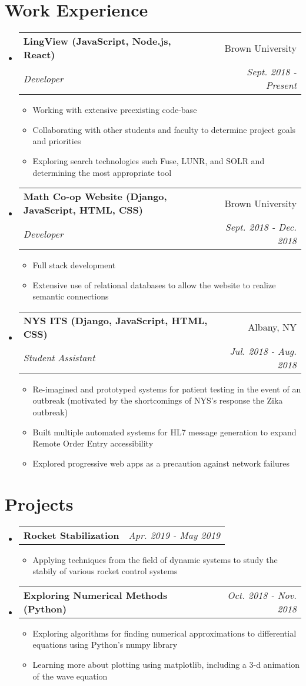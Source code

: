 \documentclass[letterpaper,11pt]{article}
\makeatletter
\newcommand{\resumeItem}[2]{
  \item\small{
    \textbf{#1}{#2 \vspace{-2pt}}
  }
}
\newcommand{\resumeSubheading}[4]{
  \vspace{-1pt}\item
    \begin{tabular*}{0.97\textwidth}{l@{\extracolsep{\fill}}r}
      \textbf{#1} & #2 \\
      \textit{\small#3} & \textit{\small #4} \\
    \end{tabular*}\vspace{-5pt}
}
\newcommand{\resumeSubheadingSimple}[2]{
  \vspace{-1pt}\item
    \begin{tabular*}{0.97\textwidth}{l@{\extracolsep{\fill}}r}
      \textbf{#1} & \textit{\small#2}\\
    \end{tabular*}\vspace{-5pt}
}
\newcommand{\resumeSubHeadingListStart}{\begin{itemize}[leftmargin=*]}
\newcommand{\resumeSubHeadingListEnd}{\end{itemize}}
\newcommand{\resumeItemListStart}{\begin{itemize}}
\newcommand{\resumeItemListEnd}{\end{itemize}\vspace{-5pt}}
\makeatother
\begin{document}
\section{Work Experience}
  \resumeSubHeadingListStart
    \resumeSubheading{LingView (JavaScript, Node.js, React)}{Brown University}{Developer}{Sept. 2018 - Present}
      \resumeItemListStart
        \resumeItem{}
        {Working with extensive preexisting code-base}
        \resumeItem{}
        {Collaborating with other students and faculty to determine project goals and priorities}
        \resumeItem{}
        {Exploring search technologies such Fuse, LUNR, and SOLR and determining the most appropriate tool}
      \resumeItemListEnd
    \resumeSubheading{Math Co-op Website (Django, JavaScript, HTML, CSS)}{Brown University}{Developer}{Sept. 2018 - Dec. 2018}
      \resumeItemListStart
        \resumeItem{}
        {Full stack development}
        \resumeItem{}
        {Extensive use of relational databases to allow the website to realize semantic connections}
      \resumeItemListEnd
    \resumeSubheading{NYS ITS (Django, JavaScript, HTML, CSS)}{Albany, NY}{Student Assistant}{Jul. 2018 - Aug. 2018}
      \resumeItemListStart
        \resumeItem{}
        {Re-imagined and prototyped systems for patient testing in the event of an outbreak (motivated by the shortcomings of NYS's response the Zika outbreak)}
        \resumeItem{}
        {Built multiple automated systems for HL7 message generation to expand Remote Order Entry accessibility}
        \resumeItem{}
        {Explored progressive web apps as a precaution against network failures}
      \resumeItemListEnd
  \resumeSubHeadingListEnd

\section{Projects}
    \resumeSubHeadingListStart
        \resumeSubheadingSimple
          {Rocket Stabilization}{Apr. 2019 - May 2019}
          \resumeItemListStart
            \resumeItem{}
            {Applying techniques from the field of dynamic systems to study the stabily of various rocket control systems}
          \resumeItemListEnd
        \resumeSubheadingSimple
          {Exploring Numerical Methods (Python)}{Oct. 2018 - Nov. 2018}
          \resumeItemListStart
            \resumeItem{}
              {Exploring algorithms for finding numerical approximations to differential equations using Python's numpy library}
            \resumeItem{}
              {Learning more about plotting using matplotlib, including a 3-d animation of the wave equation}
          \resumeItemListEnd
    \resumeSubHeadingListEnd
\end{document}
